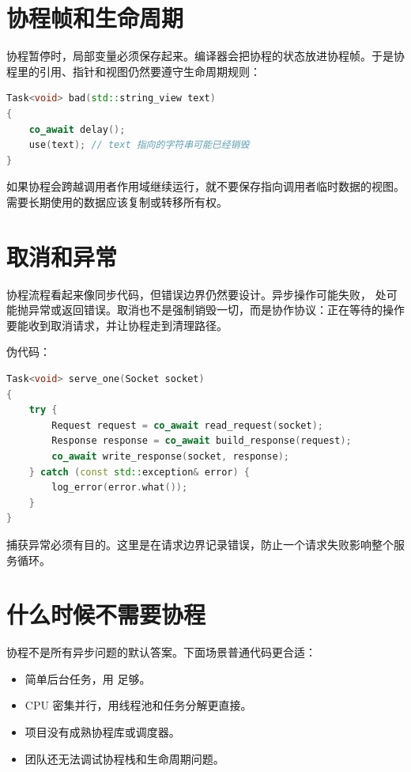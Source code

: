 \section{协程帧和生命周期}

协程暂停时，局部变量必须保存起来。编译器会把协程的状态放进协程帧。于是协程里的引用、指针和视图仍然要遵守生命周期规则：

\begin{lstlisting}[language=C++,caption={协程中捕获引用的风险示意}]
Task<void> bad(std::string_view text)
{
    co_await delay();
    use(text); // text 指向的字符串可能已经销毁
}
\end{lstlisting}

如果协程会跨越调用者作用域继续运行，就不要保存指向调用者临时数据的视图。需要长期使用的数据应该复制或转移所有权。

\section{取消和异常}

协程流程看起来像同步代码，但错误边界仍然要设计。异步操作可能失败， 处可能抛异常或返回错误。取消也不是强制销毁一切，而是协作协议：正在等待的操作要能收到取消请求，并让协程走到清理路径。

伪代码：

\begin{lstlisting}[language=C++,caption={协程中的错误边界示意}]
Task<void> serve_one(Socket socket)
{
    try {
        Request request = co_await read_request(socket);
        Response response = co_await build_response(request);
        co_await write_response(socket, response);
    } catch (const std::exception& error) {
        log_error(error.what());
    }
}
\end{lstlisting}

捕获异常必须有目的。这里是在请求边界记录错误，防止一个请求失败影响整个服务循环。

\section{什么时候不需要协程}

协程不是所有异步问题的默认答案。下面场景普通代码更合适：

\begin{itemize}
  \item 简单后台任务，用  足够。
  \item CPU 密集并行，用线程池和任务分解更直接。
  \item 项目没有成熟协程库或调度器。
  \item 团队还无法调试协程栈和生命周期问题。
\end{itemize}

